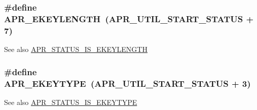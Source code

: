 \subsubsection[{\texorpdfstring{A\+P\+R\+\_\+\+E\+K\+E\+Y\+L\+E\+N\+G\+TH}{APR_EKEYLENGTH}}]{\setlength{\rightskip}{0pt plus 5cm}\#define A\+P\+R\+\_\+\+E\+K\+E\+Y\+L\+E\+N\+G\+TH~({\bf A\+P\+R\+\_\+\+U\+T\+I\+L\+\_\+\+S\+T\+A\+R\+T\+\_\+\+S\+T\+A\+T\+US} + 7)}\hypertarget{group__APR__Util__Error_gabc3c0dcf5954c161df4aff0fb0ce3ae4}{}\label{group__APR__Util__Error_gabc3c0dcf5954c161df4aff0fb0ce3ae4}
\begin{DoxySeeAlso}{See also}
\hyperlink{group__APR__Util__Error_gab705e1d1975634114d47197609b97cbf}{A\+P\+R\+\_\+\+S\+T\+A\+T\+U\+S\+\_\+\+I\+S\+\_\+\+E\+K\+E\+Y\+L\+E\+N\+G\+TH} 
\end{DoxySeeAlso}
\subsubsection[{\texorpdfstring{A\+P\+R\+\_\+\+E\+K\+E\+Y\+T\+Y\+PE}{APR_EKEYTYPE}}]{\setlength{\rightskip}{0pt plus 5cm}\#define A\+P\+R\+\_\+\+E\+K\+E\+Y\+T\+Y\+PE~({\bf A\+P\+R\+\_\+\+U\+T\+I\+L\+\_\+\+S\+T\+A\+R\+T\+\_\+\+S\+T\+A\+T\+US} + 3)}\hypertarget{group__APR__Util__Error_ga637727cdf8285d12663ddf8bb89fa048}{}\label{group__APR__Util__Error_ga637727cdf8285d12663ddf8bb89fa048}
\begin{DoxySeeAlso}{See also}
\hyperlink{group__APR__Util__Error_ga0693be89f2dc48f2931ff4572bd5872d}{A\+P\+R\+\_\+\+S\+T\+A\+T\+U\+S\+\_\+\+I\+S\+\_\+\+E\+K\+E\+Y\+T\+Y\+PE} 
\end{DoxySeeAlso}

